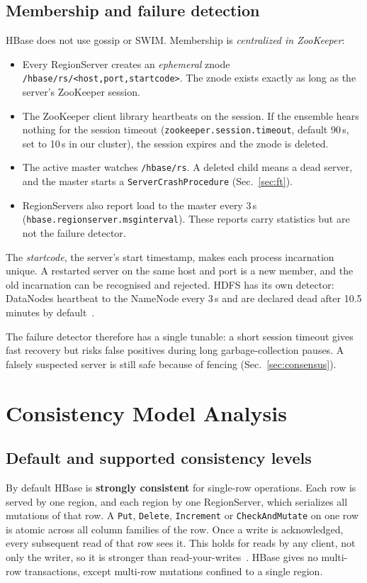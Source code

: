 \documentclass[10pt,twocolumn,letterpaper]{article}
\newcommand{\code}[1]{\texttt{\small #1}}
\begin{document}
\subsection{Membership and failure detection}
HBase does not use gossip or SWIM. Membership is \emph{centralized in ZooKeeper}:
\begin{itemize}
\item Every RegionServer creates an \emph{ephemeral} znode \code{/hbase/rs/<host,port,startcode>}. The znode exists exactly as long as the server's ZooKeeper session.
\item The ZooKeeper client library heartbeats on the session. If the ensemble hears nothing for the session timeout (\code{zookeeper.session.timeout}, default 90\,s, set to 10\,s in our cluster), the session expires and the znode is deleted.
\item The active master watches \code{/hbase/rs}. A deleted child means a dead server, and the master starts a \code{ServerCrashProcedure} (Sec.~\ref{sec:ft}).
\item RegionServers also report load to the master every 3\,s (\code{hbase.regionserver.msginterval}). These reports carry statistics but are not the failure detector.
\end{itemize}
The \emph{startcode}, the server's start timestamp, makes each process incarnation unique. A restarted server on the same host and port is a new member, and the old incarnation can be recognised and rejected. HDFS has its own detector: DataNodes heartbeat to the NameNode every 3\,s and are declared dead after 10.5 minutes by default~\cite{hdfs}.

The failure detector therefore has a single tunable: a short session timeout gives fast recovery but risks false positives during long garbage-collection pauses. A falsely suspected server is still safe because of fencing (Sec.~\ref{sec:consensus}).

\section{Consistency Model Analysis}\label{sec:cons}

\subsection{Default and supported consistency levels}
By default HBase is \textbf{strongly consistent} for single-row operations. Each row is served by one region, and each region by one RegionServer, which serializes all mutations of that row. A \code{Put}, \code{Delete}, \code{Increment} or \code{CheckAndMutate} on one row is atomic across all column families of the row. Once a write is acknowledged, every subsequent read of that row sees it. This holds for reads by any client, not only the writer, so it is stronger than read-your-writes~\cite{refguide}. HBase gives no multi-row transactions, except multi-row mutations confined to a single region.
\end{document}
